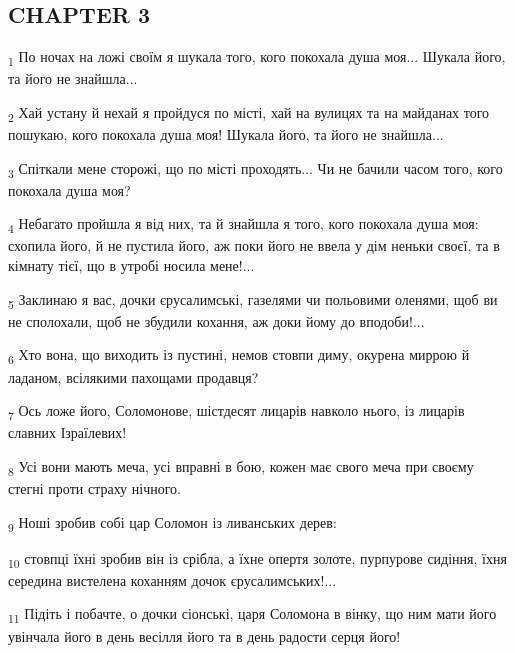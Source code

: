 \subsection{CHAPTER 3}
\begin{tcolorbox}
\textsubscript{1} По ночах на ложі своїм я шукала того, кого покохала душа моя... Шукала його, та його не знайшла...
\end{tcolorbox}
\begin{tcolorbox}
\textsubscript{2} Хай устану й нехай я пройдуся по місті, хай на вулицях та на майданах того пошукаю, кого покохала душа моя! Шукала його, та його не знайшла...
\end{tcolorbox}
\begin{tcolorbox}
\textsubscript{3} Спіткали мене сторожі, що по місті проходять... Чи не бачили часом того, кого покохала душа моя?
\end{tcolorbox}
\begin{tcolorbox}
\textsubscript{4} Небагато пройшла я від них, та й знайшла я того, кого покохала душа моя: схопила його, й не пустила його, аж поки його не ввела у дім неньки своєї, та в кімнату тієї, що в утробі носила мене!...
\end{tcolorbox}
\begin{tcolorbox}
\textsubscript{5} Заклинаю я вас, дочки єрусалимські, газелями чи польовими оленями, щоб ви не сполохали, щоб не збудили кохання, аж доки йому до вподоби!...
\end{tcolorbox}
\begin{tcolorbox}
\textsubscript{6} Хто вона, що виходить із пустині, немов стовпи диму, окурена миррою й ладаном, всілякими пахощами продавця?
\end{tcolorbox}
\begin{tcolorbox}
\textsubscript{7} Ось ложе його, Соломонове, шістдесят лицарів навколо нього, із лицарів славних Ізраїлевих!
\end{tcolorbox}
\begin{tcolorbox}
\textsubscript{8} Усі вони мають меча, усі вправні в бою, кожен має свого меча при своєму стегні проти страху нічного.
\end{tcolorbox}
\begin{tcolorbox}
\textsubscript{9} Ноші зробив собі цар Соломон із ливанських дерев:
\end{tcolorbox}
\begin{tcolorbox}
\textsubscript{10} стовпці їхні зробив він із срібла, а їхне опертя золоте, пурпурове сидіння, їхня середина вистелена коханням дочок єрусалимських!...
\end{tcolorbox}
\begin{tcolorbox}
\textsubscript{11} Підіть і побачте, о дочки сіонські, царя Соломона в вінку, що ним мати його увінчала його в день весілля його та в день радости серця його!
\end{tcolorbox}
